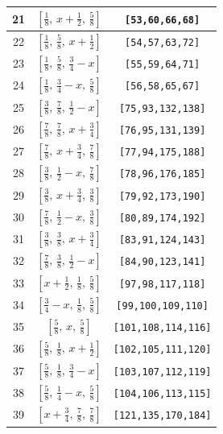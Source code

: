 \documentclass[fleqn,8pt]{jsarticle}
\begin{document}
\begin{longtable}{ccc}
21 & $\left[ \frac{1}{8},\, x + \frac{1}{2},\, \frac{5}{8} \right]$ & {\tt [53,60,66,68]} \\ \hline
22 & $\left[ \frac{1}{8},\, \frac{5}{8},\, x + \frac{1}{2} \right]$ & {\tt [54,57,63,72]} \\ \hline
23 & $\left[ \frac{1}{8},\, \frac{5}{8},\, \frac{3}{4} - x \right]$ & {\tt [55,59,64,71]} \\ \hline
24 & $\left[ \frac{1}{8},\, \frac{3}{4} - x,\, \frac{5}{8} \right]$ & {\tt [56,58,65,67]} \\ \hline
25 & $\left[ \frac{3}{8},\, \frac{7}{8},\, \frac{1}{2} - x \right]$ & {\tt [75,93,132,138]} \\ \hline
26 & $\left[ \frac{7}{8},\, \frac{7}{8},\, x + \frac{3}{4} \right]$ & {\tt [76,95,131,139]} \\ \hline
27 & $\left[ \frac{7}{8},\, x + \frac{3}{4},\, \frac{7}{8} \right]$ & {\tt [77,94,175,188]} \\ \hline
28 & $\left[ \frac{3}{8},\, \frac{1}{2} - x,\, \frac{7}{8} \right]$ & {\tt [78,96,176,185]} \\ \hline
29 & $\left[ \frac{3}{8},\, x + \frac{3}{4},\, \frac{3}{8} \right]$ & {\tt [79,92,173,190]} \\ \hline
30 & $\left[ \frac{7}{8},\, \frac{1}{2} - x,\, \frac{3}{8} \right]$ & {\tt [80,89,174,192]} \\ \hline
31 & $\left[ \frac{3}{8},\, \frac{3}{8},\, x + \frac{3}{4} \right]$ & {\tt [83,91,124,143]} \\ \hline
32 & $\left[ \frac{7}{8},\, \frac{3}{8},\, \frac{1}{2} - x \right]$ & {\tt [84,90,123,141]} \\ \hline
33 & $\left[ x + \frac{1}{2},\, \frac{1}{8},\, \frac{5}{8} \right]$ & {\tt [97,98,117,118]} \\ \hline
34 & $\left[ \frac{3}{4} - x,\, \frac{1}{8},\, \frac{5}{8} \right]$ & {\tt [99,100,109,110]} \\ \hline
35 & $\left[ \frac{5}{8},\, x,\, \frac{5}{8} \right]$ & {\tt [101,108,114,116]} \\ \hline
36 & $\left[ \frac{5}{8},\, \frac{1}{8},\, x + \frac{1}{2} \right]$ & {\tt [102,105,111,120]} \\ \hline
37 & $\left[ \frac{5}{8},\, \frac{1}{8},\, \frac{3}{4} - x \right]$ & {\tt [103,107,112,119]} \\ \hline
38 & $\left[ \frac{5}{8},\, \frac{1}{4} - x,\, \frac{5}{8} \right]$ & {\tt [104,106,113,115]} \\ \hline
39 & $\left[ x + \frac{3}{4},\, \frac{7}{8},\, \frac{7}{8} \right]$ & {\tt [121,135,170,184]} \\ \hline

\end{longtable}
\end{document}

